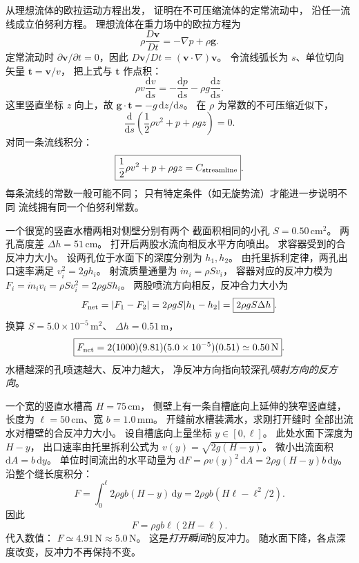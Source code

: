 从理想流体的欧拉运动方程出发，
证明在不可压缩流体的定常流动中，
沿任一流线成立伯努利方程。
\exsolution
理想流体在重力场中的欧拉方程为
\[
\rho\frac{D\bm v}{Dt}=-\nabla p+\rho\bm g.
\]
定常流动时
$\partial\bm v/\partial t=0$，因此
$D\bm v/Dt=(\bm v\cdot\nabla)\bm v$。
令流线弧长为 $s$、单位切向矢量
$\bm t=\bm v/v$，
把上式与 $\bm t$ 作点积：
\[
\rho v\frac{\mathrm dv}{\mathrm ds}
=-\frac{\mathrm dp}{\mathrm ds}
-\rho g\frac{\mathrm dz}{\mathrm ds}.
\]
这里竖直坐标 $z$ 向上，故
$\bm g\cdot\bm t=-g\,\mathrm dz/\mathrm ds$。
在 $\rho$ 为常数的不可压缩近似下，
\[
\frac{\mathrm d}{\mathrm ds}
\left(\frac12\rho v^2+p+\rho gz\right)=0.
\]
对同一条流线积分：
\[
\boxed{\frac12\rho v^2+p+\rho gz=C_{\rm streamline}}.
\]
\excheck 每条流线的常数一般可能不同；
只有特定条件（如无旋势流）才能进一步说明不同
流线拥有同一个伯努利常数。

一个很宽的竖直水槽两相对侧壁分别有两个
截面积相同的小孔 $S=0.50\,\mathrm{cm^2}$。
两孔高度差 $\Delta h=51\,\mathrm{cm}$。
打开后两股水流向相反水平方向喷出。
求容器受到的合反冲力大小。
\exsolution
设两孔位于水面下的深度分别为 $h_1,h_2$。
由托里拆利定律，两孔出口速率满足
$v_i^2=2gh_i$。
射流质量通量为
$\dot m_i=\rho S v_i$，
容器对应的反冲力模为
$F_i=\dot m_i v_i=\rho S v_i^2
=2\rho g S h_i$。
两股喷流方向相反，反冲合力大小为
\[
F_{\rm net}=|F_1-F_2|
=2\rho gS|h_1-h_2|
=\boxed{2\rho gS\Delta h}.
\]
换算 $S=5.0\times10^{-5}\,\mathrm{m^2}$、
$\Delta h=0.51\,\mathrm m$，
\[
\boxed{F_{\rm net}
=2(1000)(9.81)(5.0\times10^{-5})(0.51)
\simeq0.50\,\mathrm N}.
\]
\excheck 水槽越深的孔喷速越大、反冲力越大，
净反冲方向指向较深孔\emph{喷射方向的反方向}。

一个宽的竖直水槽高 $H=75\,\mathrm{cm}$，
侧壁上有一条自槽底向上延伸的狭窄竖直缝，
长度为 $\ell=50\,\mathrm{cm}$、宽
$b=1.0\,\mathrm{mm}$。
开缝前水槽装满水，求刚打开缝时
全部出流水对槽壁的合反冲力大小。
\exsolution
设自槽底向上量坐标 $y\in[0,\ell]$。
此处水面下深度为 $H-y$，
出口速率由托里拆利公式为
$v(y)=\sqrt{2g(H-y)}$。
微小出流面积 $\mathrm dA=b\,\mathrm dy$。
单位时间流出的水平动量为
$\mathrm dF=\rho v(y)^2\,\mathrm dA
=2\rho g(H-y)b\,\mathrm dy$。
沿整个缝长度积分：
\[
F=\int_0^\ell2\rho gb(H-y)\,\mathrm dy
=2\rho gb(H\ell-\ell^2/2).
\]
因此
\[
\boxed{F=\rho gb\ell(2H-\ell)}.
\]
代入数值：
$\boxed{F\simeq4.91\,\mathrm N\approx5.0\,\mathrm N}$。
\excheck 这是\emph{打开瞬间}的反冲力。
随水面下降，各点深度改变，反冲力不再保持不变。

